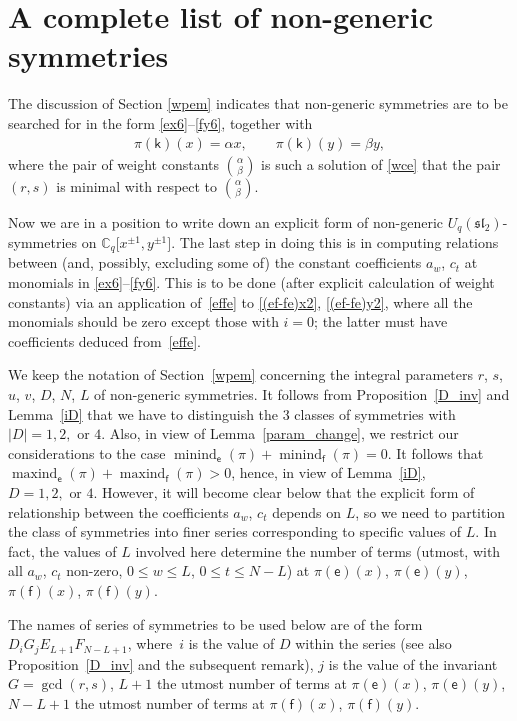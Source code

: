 \documentclass[10pt,a4paper]{amsart}
\numberwithin{equation}{section}
\begin{document}
\section{A complete list of non-generic symmetries}\label{clngs}

The discussion of Section \ref{wpem} indicates that non-generic symmetries are to be searched for in the form \eqref{ex6}--\eqref{fy6}, together with
\begin{gather*}\pi(\mathsf{k})(x)=\alpha x,\qquad\pi(\mathsf{k})(y)=\beta y,\end{gather*}
where the pair of weight constants $\binom{\alpha}{\beta}$ is such a solution of \eqref{wce} that the pair $(r,s)$ is minimal with respect to $\binom{\alpha}{\beta}$.

Now we are in a position to write down an explicit form of non-generic $U_q(\mathfrak{sl}_2)$-symmetries on $\mathbb{C}_q\big[x^{\pm 1},y^{\pm 1}\big]$. The last step in doing this is in computing relations between (and, possibly, excluding some of) the constant coefficients $a_w$, $c_t$ at monomials in \eqref{ex6}--\eqref{fy6}. This is to be done (after explicit calculation of weight constants) via an application of~\eqref{effe} to \eqref{(ef-fe)x2}, \eqref{(ef-fe)y2}, where all the monomials should be zero except those with $i=0$; the latter must have coefficients deduced from~\eqref{effe}.

We keep the notation of Section~\ref{wpem} concerning the integral parameters $r$, $s$, $u$, $v$, $D$, $N$, $L$ of non-generic symmetries. It follows from Proposition~\ref{D_inv} and Lemma~\ref{iD} that we have to distinguish the 3 classes of symmetries with $|D|=1,2,\text{\ or\ }4$. Also, in view of Lemma~\ref{param_change}, we restrict our considerations to the case $\operatorname{minind}_\mathsf{e}(\pi)+\operatorname{minind}_\mathsf{f}(\pi)=0$. It follows that $\operatorname{maxind}_\mathsf{e}(\pi)+ \operatorname{maxind}_\mathsf{f}(\pi)>0$, hence, in view of Lemma~\ref{iD}, $D=1,2,\text{\ or\ }4$. However, it will become clear below that the explicit form of relationship between the coefficients $a_w$, $c_t$ depends on $L$, so we need to partition the class of symmetries into finer series corresponding to specific values of $L$. In fact, the values of $L$ involved here determine the number of terms (utmost, with all $a_w$, $c_t$ non-zero, $0\le w\le L$, $0\le t\le N-L$) at $\pi(\mathsf{e})(x)$, $\pi(\mathsf{e})(y)$, $\pi(\mathsf{f})(x)$, $\pi(\mathsf{f})(y)$.

The names of series of symmetries to be used below are of the form $D_iG_jE_{L+1}F_{N-L+1}$, where~$i$ is the value of $D$ within the series (see also Proposition~\ref{D_inv} and the subsequent remark), $j$ is the value of the invariant $G=\operatorname{gcd}(r,s)$, $L+1$ the utmost number of terms at $\pi(\mathsf{e})(x)$, $\pi(\mathsf{e})(y)$, $N-L+1$ the utmost number of terms at $\pi(\mathsf{f})(x)$, $\pi(\mathsf{f})(y)$.
\end{document}
